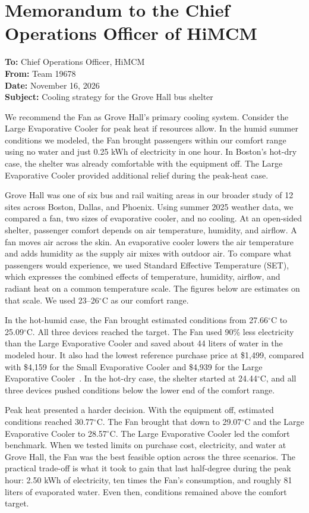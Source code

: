 \section{Memorandum to the Chief Operations Officer of HiMCM}

\noindent\textbf{To:} Chief Operations Officer, HiMCM\\
\textbf{From:} Team 19678\\
\textbf{Date:} November 16, 2026\\
\textbf{Subject:} Cooling strategy for the Grove Hall bus shelter

We recommend the Fan as Grove Hall's primary cooling system. Consider the Large Evaporative Cooler for peak heat if resources allow. In the humid summer conditions we modeled, the Fan brought passengers within our comfort range using no water and just 0.25 kWh of electricity in one hour. In Boston's hot-dry case, the shelter was already comfortable with the equipment off. The Large Evaporative Cooler provided additional relief during the peak-heat case.

Grove Hall was one of six bus and rail waiting areas in our broader study of 12 sites across Boston, Dallas, and Phoenix. Using summer 2025 weather data, we compared a fan, two sizes of evaporative cooler, and no cooling. At an open-sided shelter, passenger comfort depends on air temperature, humidity, and airflow. A fan moves air across the skin. An evaporative cooler lowers the air temperature and adds humidity as the supply air mixes with outdoor air. To compare what passengers would experience, we used Standard Effective Temperature (SET), which expresses the combined effects of temperature, humidity, airflow, and radiant heat on a common temperature scale. The figures below are estimates on that scale. We used 23--26$^{\circ}$C as our comfort range.

In the hot-humid case, the Fan brought estimated conditions from 27.66$^{\circ}$C to 25.09$^{\circ}$C. All three devices reached the target. The Fan used 90\% less electricity than the Large Evaporative Cooler and saved about 44 liters of water in the modeled hour. It also had the lowest reference purchase price at \$1,499, compared with \$4,159 for the Small Evaporative Cooler and \$4,939 for the Large Evaporative Cooler~\cite{aireye_20_price,portacool_2000,portacool_4000}. In the hot-dry case, the shelter started at 24.44$^{\circ}$C, and all three devices pushed conditions below the lower end of the comfort range.

Peak heat presented a harder decision. With the equipment off, estimated conditions reached 30.77$^{\circ}$C. The Fan brought that down to 29.07$^{\circ}$C and the Large Evaporative Cooler to 28.57$^{\circ}$C. The Large Evaporative Cooler led the comfort benchmark. When we tested limits on purchase cost, electricity, and water at Grove Hall, the Fan was the best feasible option across the three scenarios. The practical trade-off is what it took to gain that last half-degree during the peak hour: 2.50 kWh of electricity, ten times the Fan's consumption, and roughly 81 liters of evaporated water. Even then, conditions remained above the comfort target.

